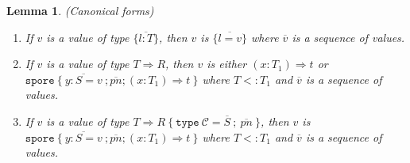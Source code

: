 \documentclass[a4paper,twoside]{article}
\newcommand{\seq}[1]{\overline{#1}}
\newtheorem{lemma}[theorem]{Lemma}
\begin{document}
\begin{lemma}
\emph{(Canonical forms)}
\label{lem:canonical}
\begin{enumerate}

\item If $v$ is a value of type $\{ \seq{l : T} \}$, then $v$ is $\{ \seq{l = v} \}$ where $\seq{v}$ is a sequence of values.

\item If $v$ is a value of type $T \Rightarrow R$, then $v$ is either $(x: T_1) \Rightarrow t$ or \\ $\texttt{spore}~\{~\seq{y : S = v}~; \seq{pn} ; (x: T_1) \Rightarrow t~\}$ where $T <: T_1$ and $\seq{v}$ is a sequence of values.

\item If $v$ is a value of type $T \Rightarrow R~\{~\texttt{type}~\mathcal{C} = \seq{S}~;~\seq{pn}~\}$, then $v$ is \\ $\texttt{spore}~\{~\seq{y : S = v}~; \seq{pn} ; (x: T_1) \Rightarrow t~\}$ where $T <: T_1$ and $\seq{v}$ is a sequence of values.


\end{enumerate}
\end{lemma}
\end{document}
